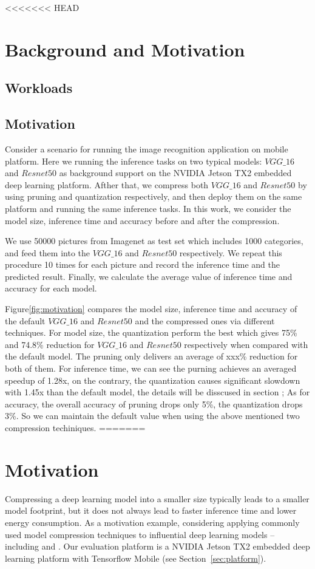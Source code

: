 <<<<<<< HEAD
\section{Background and Motivation}
\subsection{Workloads}

\subsection{Motivation}
Consider a scenario for running the image recognition application on mobile platform.
Here we running the inference tasks on
two typical models: $VGG\_16$ and $Resnet50$ as background 
support on the NVIDIA Jetson TX2 embedded deep learning platform.
Afther that, we compress both $VGG\_16$ and $Resnet50$ by using pruning 
and quantization respectively, and then deploy them on the same platform
and running the same inference tasks.
In this work, we consider the
model size, inference time and accuracy before and after the compression.

We use 50000 pictures from Imagenet as test set
which includes 1000 categories,
and feed them into the $VGG\_16$ and $Resnet50$ respectively. 
We repeat this procedure 10 times for each picture
and record the inference time and the predicted result.
Finally, we calculate the average value of inference time and accuracy
for each model.

Figure\ref{fig:motivation} compares the model size, inference time and accuracy of the default
$VGG\_16$ and $Resnet50$ and the compressed ones via different techniques.
For model size, the quantization perform the best which gives 75\% and 74.8\%
reduction for $VGG\_16$ and $Resnet50$ respectively when compared with the default model. 
The pruning only delivers an average of xxx\% reduction for both of them.
For inference time, we can see the purning achieves an averaged speedup of 1.28x,
on the contrary, the quantization causes significant slowdown with 1.45x than the default model,
the details will be disscused in section \FIXME{};
As for accuracy,  the overall accuracy of pruning drops only 5\%, the quantization drops 3\%.
So we can maintain the default value when using the above mentioned two compression techiniques.
=======

\section{Motivation}
Compressing a deep learning model into a smaller size typically leads to a smaller model footprint, but it does not always lead to faster
inference time and lower energy consumption. As a motivation example, considering applying  commonly used model compression
techniques to  influential deep learning models -- including  \CNNs and . Our evaluation platform is a
NVIDIA Jetson TX2 embedded deep learning platform with Tensorflow Mobile  (see Section~\ref{sec:platform}).


